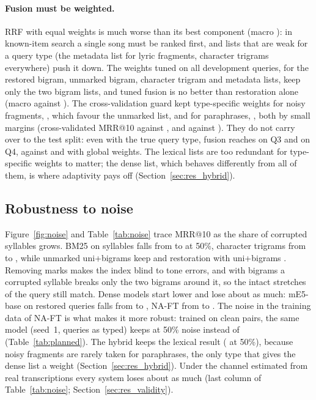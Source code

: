 \documentclass[11pt]{article}
\makeatletter
\newcommand{\Qthree}{Q3\xspace}
\newcommand{\Qfour}{Q4\xspace}
\newcommand{\mrr}{MRR@10\xspace}
\makeatother
\begin{document}
\paragraph{Fusion must be weighted.} RRF with equal weights is much worse than its best component (macro
\MFuseEqualMacro): in known-item search a single song must be ranked first, and lists that are weak for a
query type (the metadata list for lyric fragments, character trigrams everywhere) push it down. The weights
tuned on all development queries, \FuseGlobalWeights{} for the restored bigram, unmarked bigram, character
trigram and metadata lists, keep only the two bigram lists, and tuned fusion is no better than restoration
alone (macro \MFuseGlobalMacro{} against \MRestAllBiMacro). The cross-validation guard kept type-specific
weights for noisy fragments, \FuseQthreeWeights, which favour the unmarked list, and for paraphrases,
\FuseQfourWeights, both by small margins (cross-validated \mrr{} \FuseQthreeCvType{} against
\FuseQthreeCvGlobal, and \FuseQfourCvType{} against \FuseQfourCvGlobal). They do not carry over to the test
split: even with the true query type, fusion reaches \MFuseOracleThree{} on \Qthree{} and \MFuseOracleFour{}
on \Qfour, against \MFuseGlobalThree{} and \MFuseGlobalFour{} with global weights. The lexical lists are too
redundant for type-specific weights to matter; the dense list, which behaves differently from all of them, is
where adaptivity pays off (Section~\ref{sec:res_hybrid}).

\subsection{Robustness to noise}\label{sec:res_noise}
Figure~\ref{fig:noise} and Table~\ref{tab:noise} trace \mrr{} as the share of corrupted syllables grows. BM25
on syllables falls from \MSylNZero{} to \MSylNFifty{} at 50\%, character trigrams from \MCharNZero{} to
\MCharNFifty, while unmarked uni+bigrams keep \MNodiacBiNFifty{} and restoration with uni+bigrams
\MRestAllBiNFifty. Removing marks makes the index blind to tone errors, and with bigrams a corrupted
syllable breaks only the two bigrams around it, so the intact stretches of the query still match.
Dense models start lower and lose about as much: mE5-base on restored queries falls from
\MDenseEbaseRestOne{} to \MDenseEbaseRestNFifty, NA-FT from \MNaftRestOne{} to \MNaftRestNFifty. The noise
in the training data of NA-FT is what makes it more robust: trained on clean pairs, the same model (seed~1,
queries as typed) keeps \PlNonoiseNFiftyB{} at 50\% noise instead of \PlNonoiseNFiftyA{}
(Table~\ref{tab:planned}). The hybrid keeps the lexical result (\MHybNaftAdaptiveNFifty{} at 50\%), because noisy
fragments are rarely taken for paraphrases, the only type that gives the dense list a weight
(Section~\ref{sec:res_hybrid}). Under the channel estimated from real transcriptions every system loses
about as much (last column of Table~\ref{tab:noise}; Section~\ref{sec:res_validity}).
\end{document}
